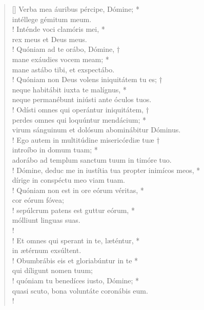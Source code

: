 \begin{verse}[\versewidth]
Verba mea áuribus pércipe, Dómine; *\\
intéllege gémitum meum.\\!
\vin Inténde voci clamóris mei, *\\
\vin rex meus et Deus meus.\\!
Quóniam ad te orábo, Dómine, †\\
mane exáudies vocem meam; *\\
mane astábo tibi, et exspectábo.\\!
\vin Quóniam non Deus volens iniquitátem tu es; †\\
\vin neque habitábit iuxta te malígnus, *\\
\vin neque permanébunt iniústi ante óculos tuos.\\!
Odísti omnes qui operántur iniquitátem, †\\
perdes omnes qui loquúntur mendácium; *\\
virum sánguinum et dolósum abominábitur Dóminus.\\!
\vin Ego autem in multitúdine misericórdiæ tuæ †\\
\vin introíbo in domum tuam; *\\
\vin adorábo ad templum sanctum tuum in timóre tuo.\\!
Dómine, deduc me in iustítia tua propter inimícos meos, *\\
dírige in conspéctu meo viam tuam.\\!
\vin Quóniam non est in ore eórum véritas, *\\
\vin cor eórum fóvea;\\!
sepúlcrum patens est guttur eórum, *\\
mólliunt linguas suas.\\!
\\!
Et omnes qui sperant in te, læténtur, *\\
in ætérnum exsúltent.\\!
\vin Obumbrábis eis et gloriabúntur in te *\\
\vin qui díligunt nomen tuum;\\!
quóniam tu benedíces iusto, Dómine; *\\
quasi scuto, bona voluntáte coronábis eum.\\!
\end{verse}
\vspace{1cm}



